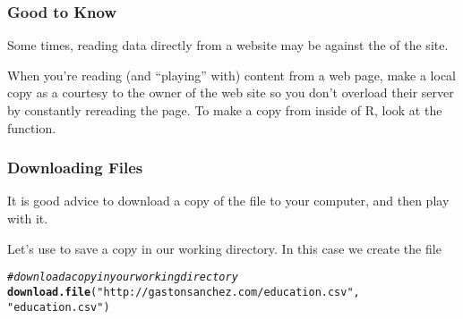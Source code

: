 \documentclass[12pt]{beamer}\usepackage[]{graphicx}\usepackage[]{color}
\makeatletter
\newcommand{\hlstr}[1]{\textcolor[rgb]{0.192,0.494,0.8}{#1}}%
\newcommand{\hlcom}[1]{\textcolor[rgb]{0.678,0.584,0.686}{\textit{#1}}}%
\newcommand{\hlstd}[1]{\textcolor[rgb]{0.345,0.345,0.345}{#1}}%
\newcommand{\hlkwd}[1]{\textcolor[rgb]{0.737,0.353,0.396}{\textbf{#1}}}%
\newenvironment{kframe}{%
 \def\at@end@of@kframe{}%
 \ifinner\ifhmode%
  \def\at@end@of@kframe{\end{minipage}}%
  \begin{minipage}{\columnwidth}%
 \fi\fi%
 \def\FrameCommand##1{\hskip\@totalleftmargin \hskip-\fboxsep
 \colorbox{shadecolor}{##1}\hskip-\fboxsep
     \hskip-\linewidth \hskip-\@totalleftmargin \hskip\columnwidth}%
 \MakeFramed {\advance\hsize-\width
   \@totalleftmargin\z@ \linewidth\hsize
   \@setminipage}}%
 {\par\unskip\endMakeFramed%
 \at@end@of@kframe}
\newenvironment{knitrout}{}{} %
\makeatother
\begin{document}

\begin{frame}
\frametitle{Good to Know}

Some times, reading data directly from a website may be against the  of the site.
\eb

When you're reading (and ``playing'' with) content from a web page, make a local copy as a courtesy to the owner of the web site so you don't overload their server by constantly rereading the page. To make a copy from inside of R, look at the  function. 
\eb

\end{frame}


\begin{frame}[fragile]
\frametitle{Downloading Files}

It is good advice to download a copy of the file to your computer, and then play with it. 

\bigskip

Let's use  to save a copy in our working directory. In this case we create the file 

\begin{knitrout}\footnotesize
{}\color{fgcolor}\begin{kframe}
\begin{alltt}
\hlcom{# download a copy in your working directory}
\hlkwd{download.file}\hlstd{(}\hlstr{"http://gastonsanchez.com/education.csv"}\hlstd{,}
              \hlstr{"education.csv"}\hlstd{)}
\end{alltt}
\end{kframe}
\end{knitrout}
\eb

\end{frame}

\end{document}
